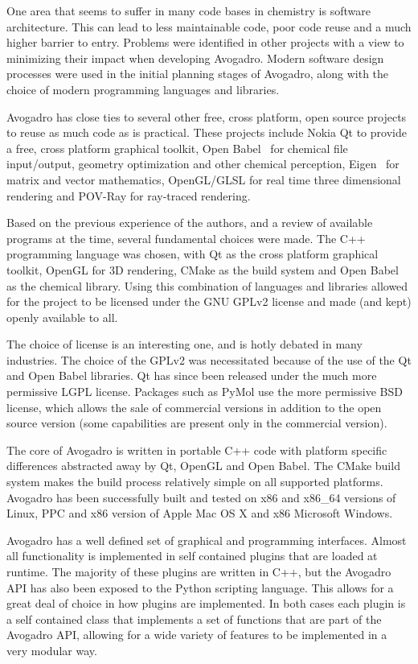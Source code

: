 \documentclass[10pt]{bmc_article}
\newenvironment{bmcformat}{\begin{raggedright}
\baselineskip20pt\sloppy\setboolean{publ}{false}}{\end{raggedright}
\baselineskip20pt\sloppy}
\begin{document}
\begin{bmcformat}
One area that seems to suffer in many code bases in chemistry is software
architecture. This can lead to less maintainable code, poor code reuse and a
much higher barrier to entry. Problems were identified in other projects with a
view to minimizing their impact when developing Avogadro. Modern software design
processes were used in the initial planning stages of Avogadro, along with the
choice of modern programming languages and libraries.


Avogadro has close ties to several other free, cross platform, open source
projects to reuse as much code as is practical. These projects include
Nokia Qt to provide a free, cross platform graphical toolkit, Open
Babel~\cite{OpenBabel} for chemical file input/output, geometry optimization and
other chemical perception, Eigen~\cite{Eigen} for matrix and vector mathematics,
OpenGL/GLSL for real time three dimensional rendering and POV-Ray for ray-traced
rendering.

Based on the previous experience of the authors, and a review of available
programs at the time, several fundamental choices were made. The C++ programming
language was chosen, with Qt as the cross platform graphical toolkit, OpenGL for
3D rendering, CMake as the build system and Open Babel as the chemical library.
Using this combination of languages and libraries allowed for the project to be
licensed under the GNU GPLv2 license and made (and kept) openly available to
all.

The choice of license is an interesting one, and is hotly debated in many
industries. The choice of the GPLv2 was necessitated because of the use of the
Qt and Open Babel libraries. Qt has since been released under the much more
permissive LGPL license. Packages such as PyMol use the more permissive BSD
license, which allows the sale of commercial versions in addition to the open
source version (some capabilities are present only in the commercial version).

The core of Avogadro is written in portable C++ code with platform specific
differences abstracted away by Qt, OpenGL and Open Babel. The CMake build system
makes the build process relatively simple on all supported platforms. Avogadro
has been successfully built and tested on x86 and x86\_64 versions of Linux, PPC
and x86 version of Apple Mac OS X and x86 Microsoft Windows.

Avogadro has a well defined set of graphical and programming interfaces. Almost
all functionality is implemented in self contained plugins that are loaded at
runtime. The majority of these plugins are written in C++, but the Avogadro API
has also been exposed to the Python scripting language. This allows for a great
deal of choice in how plugins are implemented. In both cases each plugin is a
self contained class that implements a set of functions that are part of the
Avogadro API, allowing for a wide variety of features to be implemented in a
very modular way.


\end{bmcformat}
\end{document}
